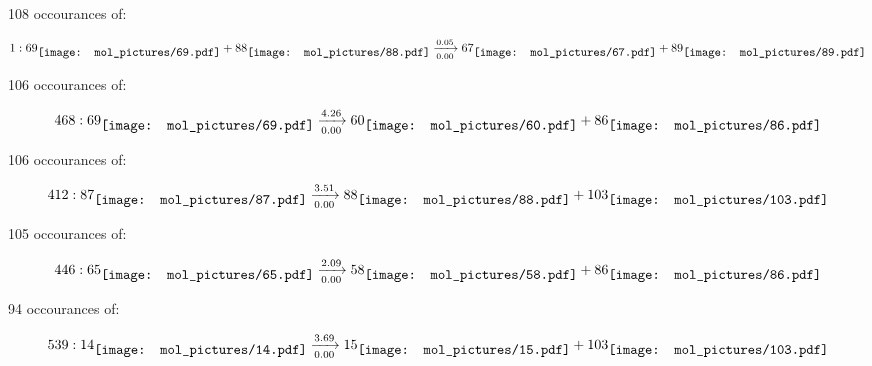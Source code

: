 \documentclass{article}
\begin{document}
\vspace{1cm}


108 occourances of:

$$
1:  
69
\raisebox{-.5\height}{\texttt{[image: mol\_pictures/69.pdf]}}
+
88
\raisebox{-.5\height}{\texttt{[image: mol\_pictures/88.pdf]}}
\xrightarrow[0.00]{0.05}
67
\raisebox{-.5\height}{\texttt{[image: mol\_pictures/67.pdf]}}
+
89
\raisebox{-.5\height}{\texttt{[image: mol\_pictures/89.pdf]}}
$$



\vspace{1cm}


106 occourances of:

$$
468:  
69
\raisebox{-.5\height}{\texttt{[image: mol\_pictures/69.pdf]}}
\xrightarrow[0.00]{4.26}
60
\raisebox{-.5\height}{\texttt{[image: mol\_pictures/60.pdf]}}
+
86
\raisebox{-.5\height}{\texttt{[image: mol\_pictures/86.pdf]}}
$$



\vspace{1cm}


106 occourances of:

$$
412:  
87
\raisebox{-.5\height}{\texttt{[image: mol\_pictures/87.pdf]}}
\xrightarrow[0.00]{3.51}
88
\raisebox{-.5\height}{\texttt{[image: mol\_pictures/88.pdf]}}
+
103
\raisebox{-.5\height}{\texttt{[image: mol\_pictures/103.pdf]}}
$$



\vspace{1cm}


105 occourances of:

$$
446:  
65
\raisebox{-.5\height}{\texttt{[image: mol\_pictures/65.pdf]}}
\xrightarrow[0.00]{2.09}
58
\raisebox{-.5\height}{\texttt{[image: mol\_pictures/58.pdf]}}
+
86
\raisebox{-.5\height}{\texttt{[image: mol\_pictures/86.pdf]}}
$$



\vspace{1cm}


94 occourances of:

$$
539:  
14
\raisebox{-.5\height}{\texttt{[image: mol\_pictures/14.pdf]}}
\xrightarrow[0.00]{3.69}
15
\raisebox{-.5\height}{\texttt{[image: mol\_pictures/15.pdf]}}
+
103
\raisebox{-.5\height}{\texttt{[image: mol\_pictures/103.pdf]}}
$$
\end{document}
